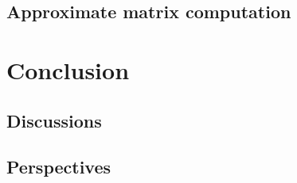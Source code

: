 \documentclass[]{article}
\begin{document}
\subsection{Approximate matrix computation}


\section{Conclusion}

\subsection{Discussions}


\subsection{Perspectives}


\printbibliography
\end{document}
